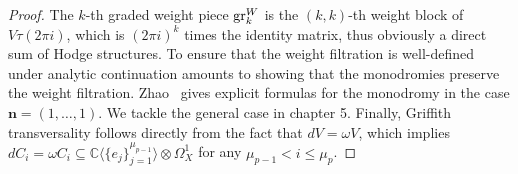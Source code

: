 \begin{proof}
The $k$-th graded weight piece $\operatorname{gr}^W_k$ is the $(k,k)$-th weight block of $V\tau(2\pi i)$, which is $(2\pi i)^k$ times the identity matrix, thus obviously a direct sum of Hodge structures. To ensure that the weight filtration is well-defined under analytic continuation amounts to showing that the monodromies preserve the weight filtration. Zhao~\cite{Zhao_AnalyticContinuationOfMultiplePolylogarithms} gives explicit formulas for the monodromy in the case $\mathbf n=(1,\dots,1)$. We tackle the general case in chapter 5. Finally, Griffith transversality follows directly from the fact that $dV=\omega V$, which implies $d C_i=\omega C_i\subseteq\mathbb C\langle\{e_j\}_{j=1}^{\mu_{p-1}}\rangle\otimes\Omega_X^1$ for any $\mu_{p-1}<i\leq\mu_p$.
\end{proof}

